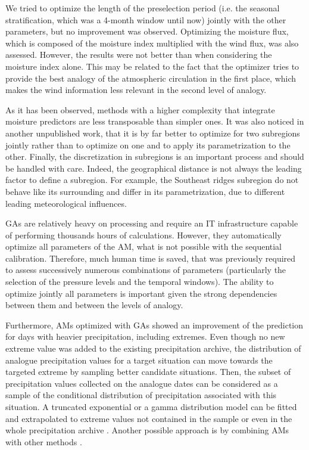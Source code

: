 \documentclass[review]{elsarticle}
\begin{document}
We tried to optimize the length of the preselection period (i.e. the seasonal stratification, which was a 4-month window until now) jointly with the other parameters, but no improvement was observed. Optimizing the moisture flux, which is composed of the moisture index multiplied with the wind flux, was also assessed. However, the results were not better than when considering the moisture index alone. This may be related to the fact that the optimizer tries to provide the best analogy of the atmospheric circulation in the first place, which makes the wind information less relevant in the second level of analogy.

As it has been observed, methods with a higher complexity that integrate moisture predictors are less transposable than simpler ones. It was also noticed in another unpublished work, that it is by far better to optimize for two subregions jointly rather than to optimize on one and to apply its parametrization to the other. Finally, the discretization in subregions is an important process and should be handled with care. Indeed, the geographical distance is not always the leading factor to define a subregion. For example, the Southeast ridges subregion do not behave like its surrounding and differ in its parametrization, due to different leading meteorological influences.

GAs are relatively heavy on processing and require an IT infrastructure capable of performing thousands hours of calculations. However, they automatically optimize all parameters of the AM, what is not possible with the sequential calibration. Therefore, much human time is saved, that was previously required to assess successively numerous combinations of parameters (particularly the selection of the pressure levels and the temporal windows). The ability to optimize jointly all parameters is important given the strong dependencies between them and between the levels of analogy.

Furthermore, AMs optimized with GAs showed an improvement of the prediction for days with heavier precipitation, including extremes. Even though no new extreme value was added to the existing precipitation archive, the distribution of analogue precipitation values for a target situation can move towards the targeted extreme by sampling better candidate situations. Then, the subset of precipitation values collected on the analogue dates can be considered as a sample of the conditional distribution of precipitation associated with this situation. A truncated exponential or a gamma distribution model can be fitted and extrapolated to extreme values not contained in the sample or even in the whole precipitation archive \citep{Obled2002}. Another possible approach is by combining AMs with other methods \citep[e.g.][]{Chardon2014}.
\end{document}
